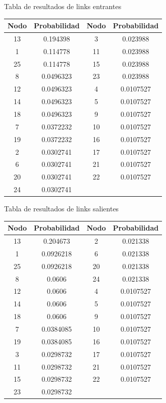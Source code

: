 Tabla de resultados de links entrantes
\begin{table}
	\begin{tabular}{|c|c|c|c|}
		\hline
		Nodo & Probabilidad & Nodo & Probabilidad \\ \hline
		13   & 0.194398     & 3    & 0.023988     \\
		1    & 0.114778     & 11   & 0.023988     \\
		25   & 0.114778     & 15   & 0.023988     \\
		8    & 0.0496323    & 23   & 0.023988     \\
		12   & 0.0496323    & 4    & 0.0107527    \\
		14   & 0.0496323    & 5    & 0.0107527    \\
		18   & 0.0496323    & 9    & 0.0107527    \\
		7    & 0.0372232    & 10   & 0.0107527    \\
		19   & 0.0372232    & 16   & 0.0107527    \\
		2    & 0.0302741    & 17   & 0.0107527    \\
		6    & 0.0302741    & 21   & 0.0107527    \\
		20   & 0.0302741    & 22   & 0.0107527    \\
		24   & 0.0302741    & ~    & ~            \\ \hline
	\end{tabular}
\end{table}


Tabla de resultados de links salientes
\begin{table}
	\begin{tabular}{|c|c|c|c|}
		\hline
		Nodo & Probabilidad & Nodo & Probabilidad \\ \hline
		13   & 0.204673     & 2    & 0.021338     \\
		1    & 0.0926218    & 6    & 0.021338     \\
		25   & 0.0926218    & 20   & 0.021338     \\
		8    & 0.0606       & 24   & 0.021338     \\
		12   & 0.0606       & 4    & 0.0107527    \\
		14   & 0.0606       & 5    & 0.0107527    \\
		18   & 0.0606       & 9    & 0.0107527    \\
		7    & 0.0384085    & 10   & 0.0107527    \\
		19   & 0.0384085    & 16   & 0.0107527    \\
		3    & 0.0298732    & 17   & 0.0107527    \\
		11   & 0.0298732    & 21   & 0.0107527    \\
		15   & 0.0298732    & 22   & 0.0107527    \\
		23   & 0.0298732    & ~    & ~            \\ \hline
	\end{tabular}
\end{table}


